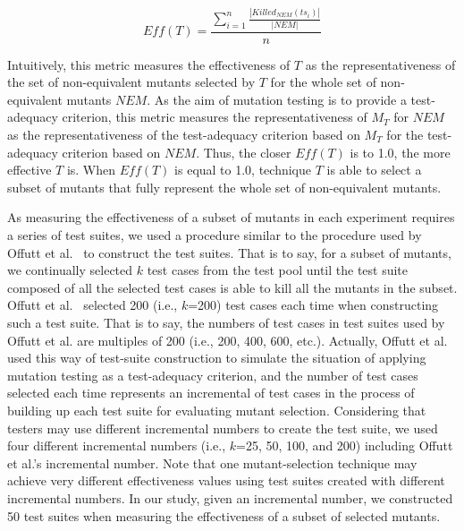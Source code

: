 \begin{equation}\label{form:Measurement}
    Eff(T)=\frac{\sum_{i=1}^n {\frac{|Killed_{NEM}(ts_i)|}{|NEM|}}}{n}
\end{equation}
\vspace{-2ex}

Intuitively, this metric measures the effectiveness of $T$ as the
representativeness of the set of non-equivalent mutants selected
by $T$ for the whole set of non-equivalent mutants $NEM$. As the
aim of mutation testing is to provide a test-adequacy criterion,
this metric measures the representativeness of $M_T$ for $NEM$ as
the representativeness of the test-adequacy criterion based on
$M_T$ for the test-adequacy criterion based on $NEM$. Thus, the
closer $Eff(T)$ is to 1.0, the more effective $T$ is. When
$Eff(T)$ is equal to 1.0, technique $T$ is able to select a subset
of mutants that fully represent the whole set of non-equivalent
mutants.

As measuring the effectiveness of a subset of mutants in each
experiment requires a series of test suites, we used a procedure
similar to the procedure used by Offutt et al.~\cite{Offutt:96} to
construct the test suites. That is to say, for a subset of
mutants, we continually selected $k$ test cases from the test pool
until the test suite composed of all the selected test cases is
able to kill all the mutants in the subset. Offutt et
al.~\cite{Offutt:96} selected 200 (i.e., $k$=200) test cases each
time when constructing such a test suite. That is to say, the
numbers of test cases in test suites used by Offutt et al. are
multiples of 200 (i.e., 200, 400, 600, etc.). Actually, Offutt et
al. used this way of test-suite construction to simulate the
situation of applying mutation testing as a test-adequacy
criterion, and the number of test cases selected each time
represents an incremental of test cases in the process of building
up each test suite for evaluating mutant selection. Considering
that testers may use different incremental numbers to create the
test suite, we used four different incremental numbers (i.e.,
$k$=25, 50, 100, and 200) including Offutt et al.'s incremental
number. Note that one mutant-selection technique may achieve very
different effectiveness values using test suites created with
different incremental numbers. In our study, given an incremental
number, we constructed 50 test suites when measuring the
effectiveness of a subset of selected mutants.


